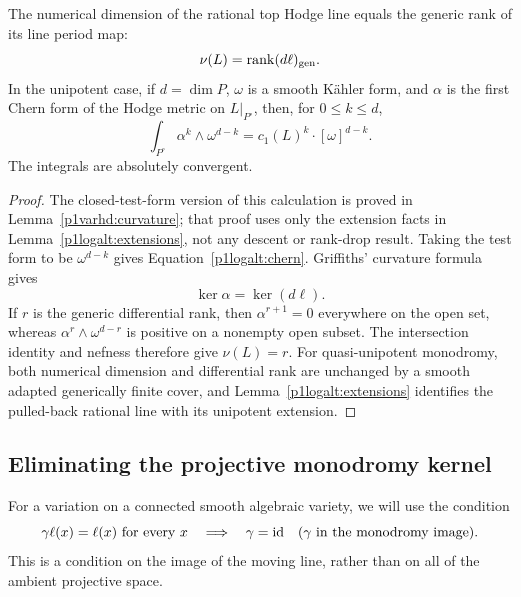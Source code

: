 \begin{lemma}\label{p1logalt:rank}
The numerical dimension of the rational top Hodge line equals the
generic rank of its line period map:
\[
 \nu(L)=\operatorname{rank}(d\ell)_{\mathrm{gen}}.
\]
In the unipotent case, if $d=\dim P$, $\omega$ is a smooth K\"ahler form,
and $\alpha$ is the first Chern form of the Hodge metric on $L|_{P^\circ}$,
then, for $0\le k\le d$,
\begin{equation}\label{p1logalt:chern}
 \int_{P^\circ}\alpha^k\wedge\omega^{d-k}
 =c_1(L)^k\cdot[\omega]^{d-k}.
\end{equation}
The integrals are absolutely convergent.
\end{lemma}

\begin{proof}
The closed-test-form version of this calculation is proved in
Lemma~\ref{p1varhd:curvature}; that proof uses only the extension facts in
Lemma~\ref{p1logalt:extensions}, not any descent or rank-drop result.
Taking the test form to be $\omega^{d-k}$ gives
Equation~\eqref{p1logalt:chern}.  Griffiths' curvature formula gives
\begin{equation}\label{p1logalt:curvature-kernel}
                 \ker\alpha=\ker(d\ell).
\end{equation}
If $r$ is the generic differential rank, then $\alpha^{r+1}=0$ everywhere
on the open set, whereas $\alpha^r\wedge\omega^{d-r}$ is positive on a
nonempty open subset.  The intersection identity and nefness therefore
give $\nu(L)=r$.  For quasi-unipotent monodromy, both numerical dimension
and differential rank are unchanged by a smooth adapted generically
finite cover, and Lemma~\ref{p1logalt:extensions} identifies the pulled-back
rational line with its unipotent extension.
\end{proof}

\subsection{Eliminating the projective monodromy kernel}

For a variation on a connected smooth algebraic variety, we will use the
condition
\begin{equation}\label{p1logalt:faithful-line}
 \gamma\ell(x)=\ell(x)\text{ for every }x
 \quad\Longrightarrow\quad \gamma=\operatorname{id}
 \quad(\gamma\text{ in the monodromy image}).
\end{equation}
This is a condition on the image of the moving line, rather than on all
of the ambient projective space.

